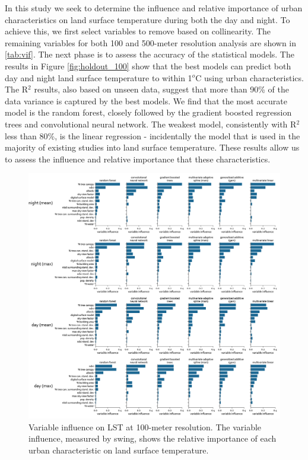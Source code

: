 \documentclass[review]{elsarticle}
\begin{document}
In this study we seek to determine the influence and relative importance of urban characteristics on land surface temperature during both the day and night.
To achieve this, we first select variables to remove based on collinearity. 
The remaining variables for both 100 and 500-meter resolution analysis are shown in \ref{tab:vif}. 
The next phase is to assess the accuracy of the statistical models.
The results in Figure \ref{fig:holdout_100} show that the best models can predict both day and night land surface temperature to within 1$^o$C using urban characteristics.
The R$^2$ results, also based on unseen data, suggest that more than 90\% of the data variance is captured by the best models.
We find that the most accurate model is the random forest, closely followed by the gradient boosted regression trees and convolutional neural network.
The weakest model, consistently with R$^2$ less than 80\%, is the linear regression - incidentally the model that is used in the majority of existing studies into land surface temperature.
These results allow us to assess the influence and relative importance that these characteristics.

\begin{figure}
    \begin{center}
    \includegraphics[width=\linewidth]{fig/report/importance_100.png}
    \caption[Variable influence on LST at 100-meter resolution]{
    Variable influence on LST at 100-meter resolution.
    The variable influence, measured by swing, shows the relative importance of each urban characteristic on land surface temperature.}
    \label{fig:importance_100}
    \end{center}
\end{figure}
\end{document}
